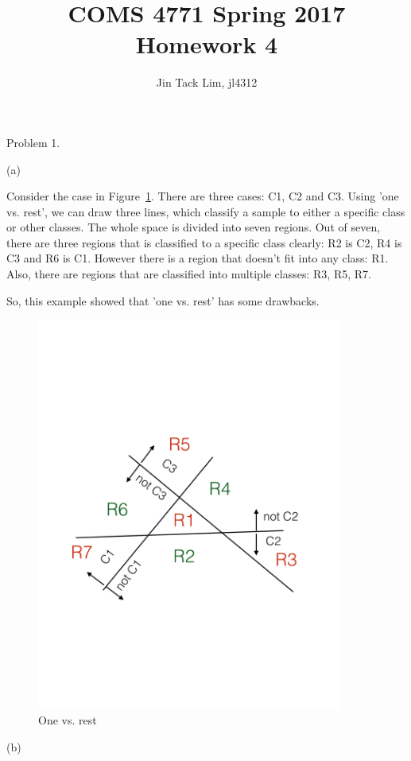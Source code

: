 \documentclass[11pt]{article}
\title{COMS 4771 Spring 2017 Homework 4}
\author{Jin Tack Lim, jl4312
  }
\date{%
  }
\theoremstyle{definition}
\begin{document}
\maketitle



Problem 1.

(a) 

Consider the case in Figure~\ref{fig:one-rest}. There are three cases: C1, C2 and C3. Using
'one vs. rest', we can draw three lines, which classify a sample to either a
specific class or other classes. The whole space is divided into seven regions.
Out of seven, there are three regions that is classified to a specific class
clearly: R2 is C2, R4 is C3 and R6 is C1.  However there is a region that
doesn't fit into any class: R1. Also, there are regions that are classified
into multiple classes: R3, R5, R7.

So, this example showed that 'one vs. rest' has some drawbacks.

\begin{figure}[h]
  \centering
  \includegraphics[width=10cm]{one-rest}
  \caption{One vs. rest}
  \label{fig:one-rest}
\end{figure}

\pagebreak

(b)
\end{document}
